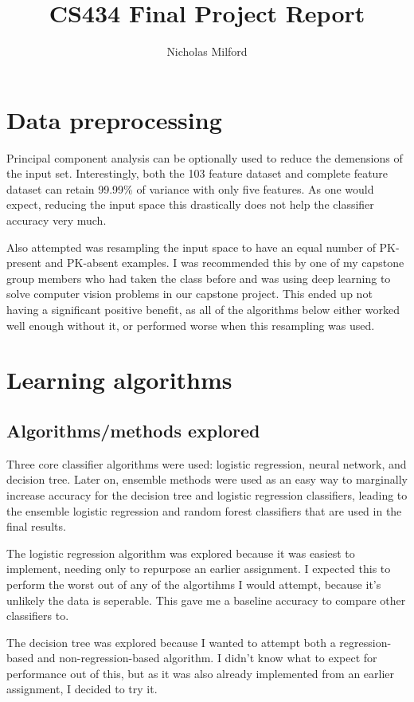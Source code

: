 \documentclass[10pt,a4paper]{article}
\title{CS434 Final Project Report}
\author{Nicholas Milford}
\date{}
\begin{document}
\maketitle
\section{Data preprocessing}
Principal component analysis can be optionally used to reduce the demensions of the input set. Interestingly, both the 103 feature dataset and complete feature dataset can retain 99.99\% of variance with only five features. As one would expect, reducing the input space this drastically does not help the classifier accuracy very much. 

Also attempted was resampling the input space to have an equal number of PK-present and PK-absent examples. I was recommended this by one of my capstone group members who had taken the class before and was using deep learning to solve computer vision problems in our capstone project. This ended up not having a significant positive benefit, as all of the algorithms below either worked well enough without it, or performed worse when this resampling was used.

\section{Learning algorithms}
\subsection{Algorithms/methods explored}
Three core classifier algorithms were used: logistic regression, neural network, and decision tree. Later on, ensemble methods were used as an easy way to marginally increase accuracy for the decision tree and logistic regression classifiers, leading to the ensemble logistic regression and random forest classifiers that are used in the final results.

The logistic regression algorithm was explored because it was easiest to implement, needing only to repurpose an earlier assignment. I expected this to perform the worst out of any of the algortihms I would attempt, because it's unlikely the data is seperable. This gave me a baseline accuracy to compare other classifiers to.

The decision tree was explored because I wanted to attempt both a regression-based and non-regression-based algorithm. I didn't know what to expect for performance out of this, but as it was also already implemented from an earlier assignment, I decided to try it. 
\end{document}
